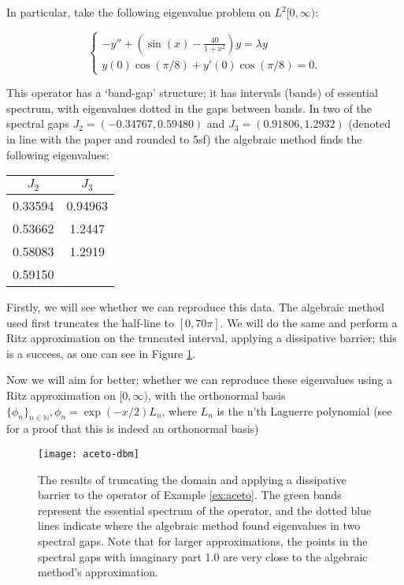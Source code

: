 \documentclass[../main.tex]{subfiles}
\begin{document}
\begin{example}\label{ex:aceto}
In particular, take the following eigenvalue problem on $L^2[0, \infty)$:

$$
\begin{cases}
-y'' + (\sin(x) - \frac{40}{1+x^2})y = \lambda y \\
y(0) \cos(\pi/8) + y'(0) \cos(\pi/8) = 0.
\end{cases}
$$

This operator has a `band-gap' structure; it has intervals (bands) of essential spectrum, with eigenvalues dotted in the gaps between bands.
In two of the spectral gaps $J_2 = (-0.34767, 0.59480)$ and $J_3 = (0.91806, 1.2932)$ (denoted in line with the paper and rounded to 5sf) the
algebraic method finds the following eigenvalues:

\begin{figure*}[h!]
\centering
\begin{tabular}{c c}
$J_2$ & $J_3$ \\
\hline\hline
0.33594 & 0.94963 \\
0.53662 & 1.2447 \\
0.58083 & 1.2919 \\
0.59150 & \\
\end{tabular}
\end{figure*}

Firstly, we will see whether we can reproduce this data. The algebraic method used first truncates the half-line to $[0, 70\pi]$. We will do the same and
perform a Ritz approximation on the truncated interval, applying a dissipative barrier; this is a success, as one can see in Figure \ref{fig:aceto-dbm}.

Now we will aim for better; whether we can reproduce these eigenvalues using a Ritz approximation on $[0, \infty)$, with the orthonormal basis $\{\phi_n\}_{n \in \mathbb{N}},
\phi_n = \exp(-x/2)L_n$, where $L_n$ is the n'th Laguerre polynomial (see \cite{szego1975orthogonal} for a proof that this is indeed an orthonormal basis)
\end{example}

\begin{figure}[p!]
\texttt{[image: aceto-dbm]}
\caption{The results of truncating the domain and applying a dissipative barrier to the operator of Example \ref{ex:aceto}.
The green bands represent the essential spectrum of the operator, and the dotted blue lines indicate where the algebraic method found
eigenvalues in two spectral gaps. Note that for larger approximations, the points in the spectral gaps with imaginary part 1.0 are
very close to the algebraic method's approximation.}
\label{fig:aceto-dbm}
\end{figure}
\clearpage
\end{document}
